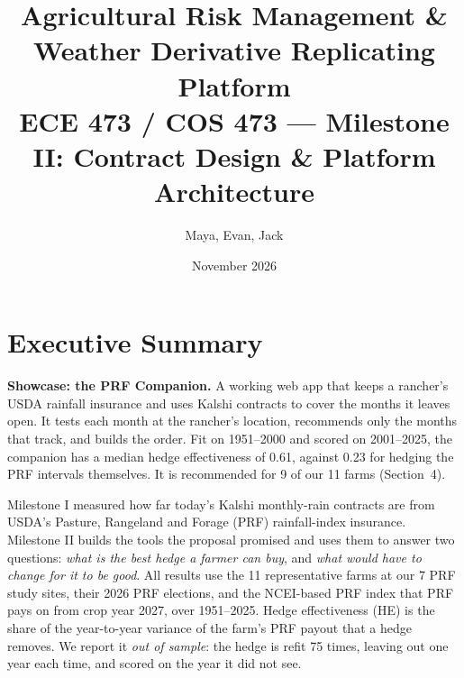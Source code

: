 \documentclass[11pt]{article}
\title{\vspace{-2em}\textbf{Agricultural Risk Management \& Weather Derivative Replicating Platform}\\[0.3em]
\large ECE 473 / COS 473 --- Milestone II: Contract Design \& Platform Architecture}
\author{Maya, Evan, Jack}
\date{November 2026}
\begin{document}
\maketitle

\section*{Executive Summary}

\textbf{Showcase: the PRF Companion.} A working web app that keeps a rancher's USDA rainfall insurance and
uses Kalshi contracts to cover the months it leaves open. It tests each month at the rancher's location,
recommends only the months that track, and builds the order. Fit on 1951--2000 and scored on 2001--2025,
the companion has a median hedge effectiveness of 0.61, against 0.23 for hedging the PRF intervals themselves.
It is recommended for 9 of our 11 farms (Section~4).

Milestone I measured how far today's Kalshi monthly-rain contracts are from USDA's Pasture, Rangeland
and Forage (PRF) rainfall-index insurance. Milestone II builds the tools the proposal promised and uses
them to answer two questions: \emph{what is the best hedge a farmer can buy}, and \emph{what would have to
change for it to be good}. All results use the 11 representative farms at our 7 PRF study sites, their
2026 PRF elections, and the NCEI-based PRF index that PRF pays on from crop year 2027, over 1951--2025.
Hedge effectiveness (HE) is the share of the year-to-year variance of the farm's PRF payout that a hedge
removes. We report it \emph{out of sample}: the hedge is refit 75 times, leaving out one year each time,
and scored on the year it did not see.
\end{document}
